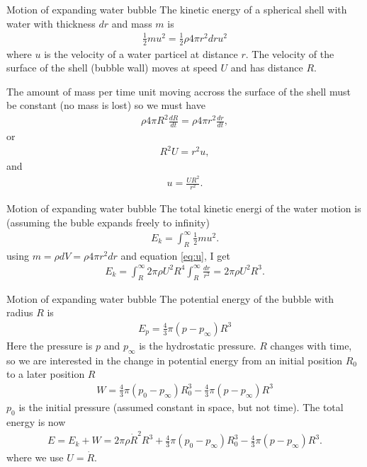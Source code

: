 \documentclass[xcolor=dvipsnames,notes]{beamer}
\begin{document}
\begin{frame}{Motion of expanding water bubble}
The kinetic energy of a spherical shell with water with
thickness $dr$ and mass $m$ is
\begin{eqnarray}
   \frac{1}{2}m u^2 = \frac{1}{2}\rho 4\pi r^2 dr u^2
\end{eqnarray}
where $u$ is the velocity of a water particel at distance $r$.
The velocity of the surface of the shell (bubble wall) moves at
speed $U$ and has distance $R$.

The amount of mass per time unit moving accross the surface of the shell
must be constant (no mass is lost) so we must have
\begin{eqnarray}
\rho 4\pi R^2 \frac{dR}{dt} = \rho 4\pi r^2 \frac{dr}{dt},
\end{eqnarray}
or
\begin{eqnarray}
 R^2 U = r^2 u, 
\end{eqnarray}
and
\begin{eqnarray}
u = \frac{UR^2}{r^2}.
        \label{eq:u}
\end{eqnarray}
\end{frame}
\begin{frame}{Motion of expanding water bubble}
The total kinetic energi of the water motion is
(assuming the buble expands freely to infinity)
\begin{eqnarray}
E_k =\int_R^{\infty} \frac{1}{2}mu^2. 
\end{eqnarray}
using $m = \rho dV = \rho 4\pi r^2 dr$
and equation \eqref{eq:u}, I get
\begin{eqnarray}
E_k =\int_R^{\infty} 2\pi\rho U^2R^4\int_R^{\infty}\frac{dr}{r^2} 
    =2\pi\rho U^2 R^3.
\end{eqnarray}
\end{frame}
\begin{frame}{Motion of expanding water bubble}
The potential energy of the bubble with radius $R$ is
\begin{eqnarray}
E_p = \frac{4}{3}\pi (p-p_{\infty}) R^3
\end{eqnarray}
Here the pressure is $p$ and $p_{\infty}$ is
the hydrostatic pressure.
$R$ changes with time, so we are interested in
the change in potential energy from an initial position
$R_0$ to a later position $R$
\begin{eqnarray}
W = \frac{4}{3}\pi (p_0-p_{\infty}) R_0^3-\frac{4}{3}\pi (p-p_{\infty}) R^3
\end{eqnarray}
$p_0$ is the initial pressure (assumed constant in space, but not time).
The total energy is now
\begin{eqnarray}
E = E_k + W = 2\pi\rho \dot{R}^2 R^3 + 
    \frac{4}{3}\pi (p_0-p_{\infty}) R_0^3-\frac{4}{3}\pi (p-p_{\infty}) R^3.
\end{eqnarray}
where we use $U=\dot{R}$.
\end{frame}
\end{document}
